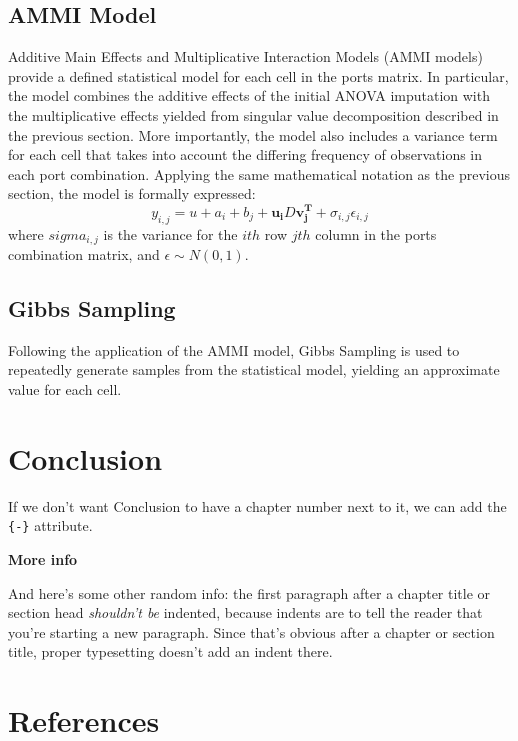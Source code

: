 \documentclass[12pt,twoside]{dukestatscithesis}
\theoremstyle{definition}
\theoremstyle{definition}
\theoremstyle{definition}
\theoremstyle{remark}
\begin{document}
\section{AMMI Model}\label{ammi-model}

Additive Main Effects and Multiplicative Interaction Models (AMMI
models) provide a defined statistical model for each cell in the ports
matrix. In particular, the model combines the additive effects of the
initial ANOVA imputation with the multiplicative effects yielded from
singular value decomposition described in the previous section. More
importantly, the model also includes a variance term for each cell that
takes into account the differing frequency of observations in each port
combination. Applying the same mathematical notation as the previous
section, the model is formally expressed:
\[y_{i,j} = u + a_i + b_j + \mathbf{u_i}D\mathbf{v_j^T} + \sigma_{i,j}\epsilon_{i,j}\]
where \(sigma_{i,j}\) is the variance for the \(ith\) row \(jth\) column
in the ports combination matrix, and \(\epsilon \sim N(0,1)\).

\section{Gibbs Sampling}\label{gibbs-sampling}

Following the application of the AMMI model, Gibbs Sampling is used to
repeatedly generate samples from the statistical model, yielding an
approximate value for each cell.

\chapter*{Conclusion}\label{conclusion}

If we don't want Conclusion to have a chapter number next to it, we can
add the \texttt{\{-\}} attribute.

\textbf{More info}

And here's some other random info: the first paragraph after a chapter
title or section head \emph{shouldn't be} indented, because indents are
to tell the reader that you're starting a new paragraph. Since that's
obvious after a chapter or section title, proper typesetting doesn't add
an indent there.

\backmatter

\chapter*{References}\label{references}
\end{document}
